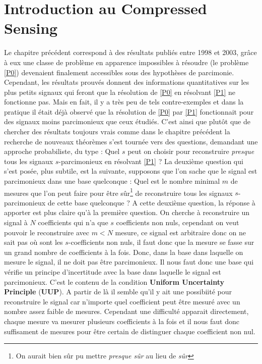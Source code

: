 \section{Introduction au Compressed Sensing}
Le chapitre précédent correspond à des résultats publiés entre 1998 et 2003, grâce à eux une classe de problème en apparence impossibles à résoudre (le problème \ref{P0}) devenaient finalement accessibles sous des hypothèses de parcimonie. 
Cependant, les résultats prouvés donnent des informations quantitatives sur les plus petits signaux qui feront que la résolution de \ref{P0} en résolvant \ref{P1} ne fonctionne pas.
Mais en fait, il y a très peu de tels contre-exemples et dans la pratique il était déjà observé que la résolution de \ref{P0} par \ref{P1} fonctionnait pour des signaux moins parcimonieux que ceux étudiés.
C'est ainsi que plutôt que de chercher des résultats toujours vrais comme dans le chapitre précédent la recherche de nouveaux théorèmes s'est tournée vers des questions, demandant une approche probabiliste, du type : Quel $s$ peut on choisir pour reconstruire \emph{presque} tous les signaux $s$-parcimonieux en résolvant \ref{P1} ?
\newline 
La deuxième question qui s'est posée, plus subtile, est la suivante, supposons que l'on sache que le signal est parcimonieux dans une base quelconque : Quel est le nombre minimal $m$ de mesures que l'on peut faire pour être sûr\footnote{On aurait bien sûr pu mettre \emph{presque sûr} au lieu de \emph{sûr}} de reconstruire tous les signaux $s$-parcimonieux de cette base quelconque ?
\newline
A cette deuxième question, la réponse à apporter est plus claire qu'à la première question.
On cherche à reconstruire un signal à $N$ coefficients qui n'a que $s$ coefficients non nuls, cependant on veut pouvoir le reconstruire avec $m<N$ mesure, ce signal est arbitraire donc on ne sait pas où sont les $s$-coefficients non nuls, il faut donc que la mesure se fasse sur un grand nombre de coefficients à la fois.
Donc, dans la base dans laquelle on mesure le signal, il ne doit pas être parcimonieux.
Il nous faut donc une base qui vérifie un principe d'incertitude avec la base dans laquelle le signal est parcimonieux.
C'est le contenu de la condition \textbf{Uniform Uncertainty Principle} (\textbf{UUP}).
\newline
A partir de là il semble qu'il y ait une possibiité pour reconstruire le signal car n'importe quel coefficient peut être mesuré avec un nombre assez faible de mesures. 
Cependant une difficulté apparait directement, chaque mesure va mesurer plusieurs coefficients à la fois et il  nous faut donc suffisament de mesures pour être certain de distinguer chaque coefficient non nul.
